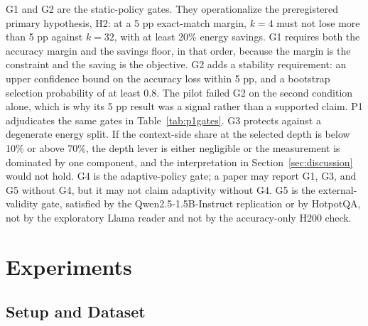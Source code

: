 \documentclass[a4paper,fleqn]{cas-sc}
\begin{document}
G1 and G2 are the static-policy gates. They operationalize the preregistered primary hypothesis, H2: at a 5 pp exact-match margin, $k=4$ must not lose more than 5 pp against $k=32$, with at least 20\% energy savings. G1 requires both the accuracy margin and the savings floor, in that order, because the margin is the constraint and the saving is the objective. G2 adds a stability requirement: an upper confidence bound on the accuracy loss within 5 pp, and a bootstrap selection probability of at least 0.8. The pilot failed G2 on the second condition alone, which is why its 5 pp result was a signal rather than a supported claim. P1 adjudicates the same gates in Table~\ref{tab:p1gates}. G3 protects against a degenerate energy split. If the context-side share at the selected depth is below 10\% or above 70\%, the depth lever is either negligible or the measurement is dominated by one component, and the interpretation in Section~\ref{sec:discussion} would not hold. G4 is the adaptive-policy gate; a paper may report G1, G3, and G5 without G4, but it may not claim adaptivity without G4. G5 is the external-validity gate, satisfied by the Qwen2.5-1.5B-Instruct replication or by HotpotQA, not by the exploratory Llama reader and not by the accuracy-only H200 check.

\section{Experiments}\label{sec:experiment}

\subsection{Setup and Dataset}\label{sec:setup}\label{sec:dataset}
\end{document}
